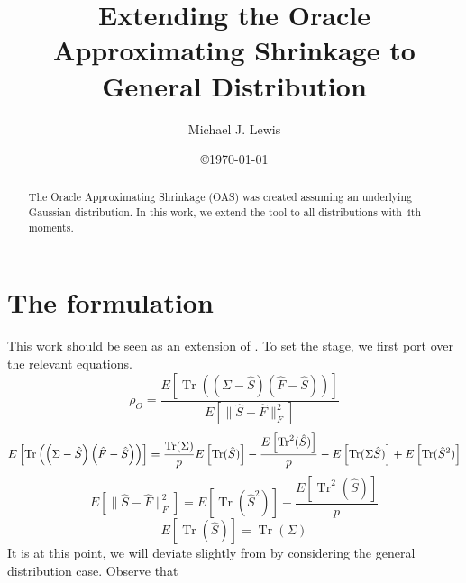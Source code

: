 \documentclass[10pt,twoside,titlepage]{article}   %
\begin{document}
\title{Extending the Oracle Approximating Shrinkage to General Distribution}
\author{Michael J. Lewis}
\date{\copyright\today}         %

\maketitle

\begin{abstract}
The Oracle Approximating Shrinkage (OAS) was created assuming an underlying Gaussian distribution.
In this work, we extend the tool to all distributions with 4th moments.
\end{abstract}

\section{The formulation}\label{sec-formulation}
This work should be seen as an extension of \cite{OAS}. To set the stage, we first port over the relevant equations.
\begin{equation}
\rho_O = \frac{ E \left[ \operatorname{Tr} \left( \left( \Sigma - \hat{S} \right) \left( \hat{F} - \hat{S} \right) \right) \right] }{ E \left[ \lVert \hat{S} - \hat{F} \rVert_F^2 \right] }
\end{equation}
\begin{equation}
E \left[ \operatorname{Tr} \left( \left( \Sigma - \hat{S} \right) \left( \hat{F} - \hat{S} \right) \right) \right] =
\frac{\operatorname{Tr}( \Sigma )}{p} E \left[ \operatorname{Tr}(\hat{S})\right] 
- \frac{ E \left[ \operatorname{Tr}^2(\hat{S})\right] }{ p } \\
- E \left[ \operatorname{Tr}(\Sigma \hat{S})\right]
+ E \left[ \operatorname{Tr}(\hat{S}^2)\right]
\end{equation}
\begin{equation}
E \left[ \lVert \hat{S} - \hat{F} \rVert_F^2 \right] =
E \left[ \operatorname{Tr}(\hat{S}^2)\right]
- \frac{ E \left[ \operatorname{Tr}^2(\hat{S})\right] }{ p }
\end{equation}
\begin{equation}
E \left[ \operatorname{Tr}(\hat{S})\right] = \operatorname{Tr}(\Sigma)
\end{equation}
It is at this point, we will deviate slightly from \cite{OAS} by considering the general distribution case.
Observe that
\end{document}
